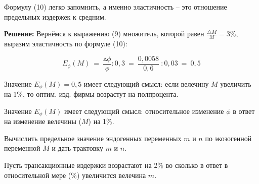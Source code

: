 \documentclass[12pt,a4paper]{article}
\begin{document}
Формулу (10) легко запомнить, а именно эластичность -- это отношение предельных издержек к средним.

\textbf{Решение:} Вернёмся к выражению (9) множитель, которой равен $\displaystyle{\frac{\triangle M}{M} = 3\%}$, выразим эластичность по формуле (10):

\begin{equation*}
E_{\phi }( M) \ =\ \frac{\vartriangle \phi }{\phi } :0,3\ =\ \frac{0,0058}{0,6} \ :0,03\ =\ 0,5
\end{equation*}

Значение $E_{\phi}(M) = 0,5$ имеет следующий смысл: если велечину $M$ увеличить на 1\%, то оптим. изд. фирмы возрастут на полпроцента.

Значение $E_{\phi}(M)$ имеет следующий смысл: относительное изменение $\phi$ в ответ на изменение велечины ($M$) на 1\%. 


 Вычислить предельное значение эндогенных переменных $m$ и $n$ по экозогенной переменной $M$ и дать трактовку $m$ и $n$. 

Пусть трансакционные издержки возрастают на 2\% во сколько в ответ в относительной мере (\%) увеличится велечина $m$.
\end{document}
